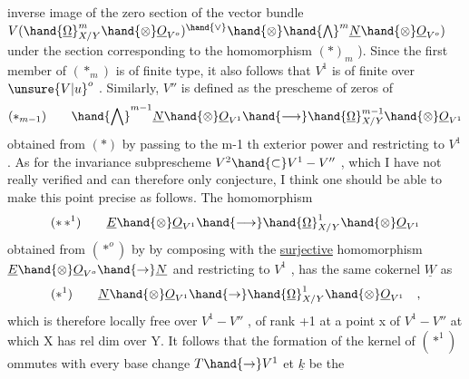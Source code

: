 
inverse image of the zero section of the vector bundle $V(\hand{\underline{\Omega}}^m_{X/Y}\hand{\otimes}\underline{O}_{V^o})^{\hand{\vee}}\hand{\otimes}\hand{\bigwedge}^m\underline{N}\hand{\otimes}\underline{O}_{V^o})$
under the section corresponding to the homomorphism $(*)_{m}$ ). Since the first member
of $(*_m)$ is of finite type, it also follows that $V^1$ is of finite 
over $\unsure{V|u}^o$ . Similarly, $V''$ is defined as the prescheme of zeros of
\[ (*_{m-1}) \qquad \hand{\bigwedge}^{m-1}\underline{N}\hand{\otimes}\underline{O}_{V^1} \hand{\longrightarrow} \hand{\underline{\Omega}}^{m-1}_{X/Y}\hand{\otimes}\underline{O}_{V^1} \]
obtained from $(*)$ by passing to the m-1 th exterior power and restricting to
$V^1$ . As for the invariance  subprescheme $V^2\hand{\subset} V^1-V''$ , which I have not really
verified and can therefore only conjecture, I think one should be able
to make this point precise as follows. The homomorphism
\[ (*\,*^1) \qquad \underline{E}\hand{\otimes}\underline{O}_{V^1}\hand{\longrightarrow}\hand{\underline{\Omega}}^1_{X/Y}\hand{\otimes}\underline{O}_{V^1} \]
obtained from $(*^o)$ by  by composing with the
\uline{surjective} homomorphism $\underline{E}\hand{\otimes}\underline{O}_{V^o}\hand{\to}\underline{N}$ and  restricting to $V^1$ , has the same cokernel
$\underline{W}$ as
\[ (*^1) \qquad \underline{N}\hand{\otimes}\underline{O}_{V^1}\hand{\to}\hand{\underline{\Omega}}^1_{X/Y}\hand{\otimes}\underline{O}_{V^1} \quad , \]
which  is therefore locally free over $V^1-V''$ , \hand{(}of rank +1 at a point
x of $V^1-V''$ at which X has rel dim  over Y\hand{)}. It follows that the formation
of the kernel of $(*^1)$ ommutes with every base change $T\hand{\to} V^1$ et $\underline{k}$ be the
